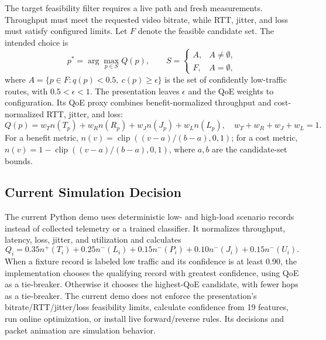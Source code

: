 \documentclass[conference]{IEEEtran}
\begin{document}
The target feasibility filter requires a live path and fresh measurements. Throughput must meet the requested video bitrate, while RTT, jitter, and loss must satisfy configured limits. Let $F$ denote the feasible candidate set. The intended choice is
\begin{equation}
 p^*=\arg\max_{p\in S}Q(p),\qquad
 S=\begin{cases}A,&A\ne\emptyset,\\F,&A=\emptyset,\end{cases}
\end{equation}
where $A=\{p\in F:q(p)<0.5,\ c(p)\geq\epsilon\}$ is the set of confidently low-traffic routes, with $0.5<\epsilon<1$. The presentation leaves $\epsilon$ and the QoE weights to configuration. Its QoE proxy combines benefit-normalized throughput and cost-normalized RTT, jitter, and loss:
\begin{equation}
 Q(p)=w_Tn(T_p)+w_Rn(R_p)+w_Jn(J_p)+w_Ln(L_p),
 \quad w_T+w_R+w_J+w_L=1.
\end{equation}
For a benefit metric, $n(v)=\operatorname{clip}((v-a)/(b-a),0,1)$; for a cost metric, $n(v)=1-\operatorname{clip}((v-a)/(b-a),0,1)$, where $a,b$ are the candidate-set bounds.

\subsection{Current Simulation Decision}
The current Python demo uses deterministic low- and high-load scenario records instead of collected telemetry or a trained classifier. It normalizes throughput, latency, loss, jitter, and utilization and calculates
\begin{equation}
 Q_i=0.35n^{+}(T_i)+0.25n^{-}(L_i)+0.15n^{-}(P_i)
 +0.10n^{-}(J_i)+0.15n^{-}(U_i).
\end{equation}
When a fixture record is labeled low traffic and its confidence is at least 0.90, the implementation chooses the qualifying record with greatest confidence, using QoE as a tie-breaker. Otherwise it chooses the highest-QoE candidate, with fewer hops as a tie-breaker. The current demo does not enforce the presentation's bitrate/RTT/jitter/loss feasibility limits, calculate confidence from 19 features, run online optimization, or install live forward/reverse rules. Its decisions and packet animation are simulation behavior.
\end{document}
